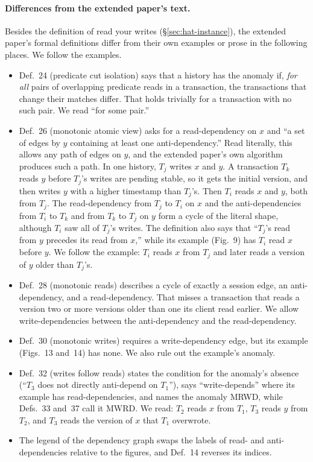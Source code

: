 \paragraph{Differences from the extended paper's text.}
Besides the definition of read your writes (\S\ref{sec:hat-instance}), the
extended paper's formal definitions differ from their own examples or prose in
the following places.  We follow the examples.
\begin{itemize}
  \item Def.~24 (predicate cut isolation) says that a history has the anomaly
        if, \emph{for all} pairs of overlapping predicate reads in a
        transaction, the transactions that change their matches differ.
        That holds trivially for a transaction with no such pair.  We read
        ``for some pair.''
  \item Def.~26 (monotonic atomic view) asks for a read-dependency on $x$ and
        ``a set of edges by $y$ containing at least one anti-dependency.''
        Read literally, this allows any path of edges on $y$, and the
        extended paper's own algorithm produces such a path.  In one history,
        $T_j$ writes $x$ and $y$.  A transaction $T_k$ reads $y$ before
        $T_j$'s writes are pending stable, so it gets the initial version, and
        then writes $y$ with a higher timestamp than $T_j$'s.  Then $T_i$
        reads $x$ and $y$, both from $T_j$.  The read-dependency from $T_j$ to
        $T_i$ on $x$ and the anti-dependencies from $T_i$ to $T_k$ and from
        $T_k$ to $T_j$ on $y$ form a cycle of the literal shape, although
        $T_i$ saw all of $T_j$'s writes.  The definition also says that
        ``$T_j$'s read from $y$ precedes its read from $x$,'' while its
        example (Fig.~9) has $T_i$ read $x$ before $y$.  We follow the
        example: $T_i$ reads $x$ from $T_j$ and later reads a version of $y$
        older than $T_j$'s.
  \item Def.~28 (monotonic reads) describes a cycle of exactly a session
        edge, an anti-dependency, and a read-dependency.  That misses a
        transaction that reads a version two or more versions older than one
        its client read earlier.  We allow write-dependencies between the
        anti-dependency and the read-dependency.
  \item Def.~30 (monotonic writes) requires a write-dependency edge, but its
        example (Figs.~13 and~14) has none.  We also rule out the example's
        anomaly.
  \item Def.~32 (writes follow reads) states the condition for the anomaly's
        absence (``$T_3$ does not directly anti-depend on $T_1$''), says
        ``write-depends'' where its example has read-dependencies, and names
        the anomaly MRWD, while Defs.~33 and~37 call it MWRD.  We read:
        $T_2$ reads $x$ from $T_1$, $T_3$ reads $y$ from $T_2$, and $T_3$
        reads the version of $x$ that $T_1$ overwrote.
  \item The legend of the dependency graph swaps the labels of read- and
        anti-dependencies relative to the figures, and Def.~14 reverses its
        indices.
\end{itemize}
